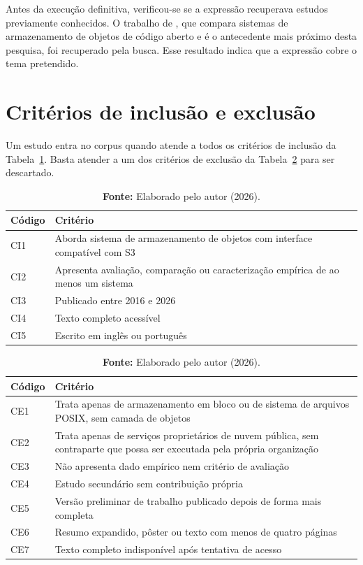 Antes da execução definitiva, verificou-se se a expressão recuperava estudos
previamente conhecidos. O trabalho de \citep{tast2026comparative}, que
compara sistemas de armazenamento de objetos de código aberto e é o antecedente
mais próximo desta pesquisa, foi recuperado pela busca. Esse resultado indica
que a expressão cobre o tema pretendido.

\section{Critérios de inclusão e exclusão}
\label{sec:criterios}

Um estudo entra no corpus quando atende a todos os critérios de inclusão da
Tabela~\ref{tab:inclusao}. Basta atender a um dos critérios de exclusão da
Tabela~\ref{tab:exclusao} para ser descartado.

\begin{table}[htb]
\centering
\caption{Critérios de inclusão.}
\label{tab:inclusao}
\begin{tabular}{@{}lp{10cm}@{}}
\toprule
\textbf{Código} & \textbf{Critério} \\
\midrule
CI1 & Aborda sistema de armazenamento de objetos com interface compatível com S3 \\
CI2 & Apresenta avaliação, comparação ou caracterização empírica de ao menos um sistema \\
CI3 & Publicado entre 2016 e 2026 \\
CI4 & Texto completo acessível \\
CI5 & Escrito em inglês ou português \\
\bottomrule
\end{tabular}
\caption*{\textbf{Fonte:} Elaborado pelo autor (2026).}
\end{table}

\begin{table}[htb]
\centering
\caption{Critérios de exclusão.}
\label{tab:exclusao}
\begin{tabular}{@{}lp{10cm}@{}}
\toprule
\textbf{Código} & \textbf{Critério} \\
\midrule
CE1 & Trata apenas de armazenamento em bloco ou de sistema de arquivos POSIX,
      sem camada de objetos \\
CE2 & Trata apenas de serviços proprietários de nuvem pública, sem contraparte
      que possa ser executada pela própria organização \\
CE3 & Não apresenta dado empírico nem critério de avaliação \\
CE4 & Estudo secundário sem contribuição própria \\
CE5 & Versão preliminar de trabalho publicado depois de forma mais completa \\
CE6 & Resumo expandido, pôster ou texto com menos de quatro páginas \\
CE7 & Texto completo indisponível após tentativa de acesso \\
\bottomrule
\end{tabular}
\caption*{\textbf{Fonte:} Elaborado pelo autor (2026).}
\end{table}

